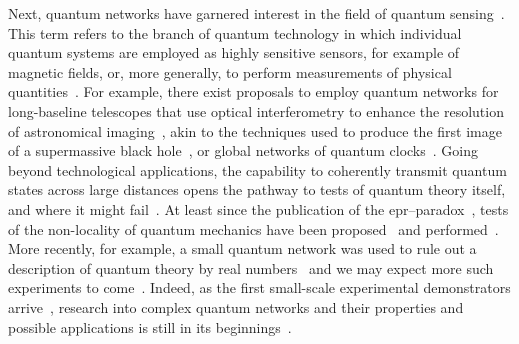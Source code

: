 Next, quantum networks have garnered interest in the field of quantum sensing~\cite{Eldredge2018}.
This term refers to the branch of quantum technology in which individual quantum systems are employed as highly sensitive sensors, for example of magnetic fields, or, more generally, to perform measurements of physical quantities~\cite{Giovannetti2004,Degen2017}.
For example, there exist proposals to employ quantum networks for long-baseline telescopes that use optical interferometry to enhance the resolution of astronomical imaging~\cite{Gottesman2012,Khabiboulline2019}, akin to the techniques used to produce the first image of a supermassive black hole~\cite{TheEventHorizonTelescopeCollaboration2019}, or global networks of quantum clocks~\cite{Komar2014}.
Going beyond technological applications, the capability to coherently transmit quantum states across large distances opens the pathway to tests of quantum theory itself, and where it might fail~\cite{Weinberg1989}.
At least since the publication of the \gls{epr}--paradox~\cite{Einstein1935}, tests of the non-locality of quantum mechanics have been proposed~\cite{Bell1964,Clauser1969} and performed~\cite{Hensen2015,Storz2023}.
More recently, for example, a small quantum network was used to rule out a description of quantum theory by real numbers~\cite{Li2022} and we may expect more such experiments to come~\cite{Shadbolt2014}.
Indeed, as the first small-scale experimental demonstrators arrive~\cite{Knaut2024,Liu2024,Kucera2024,Stolk2024}, research into complex quantum networks and their properties and possible applications is still in its beginnings~\cite{Nokkala2024}.

